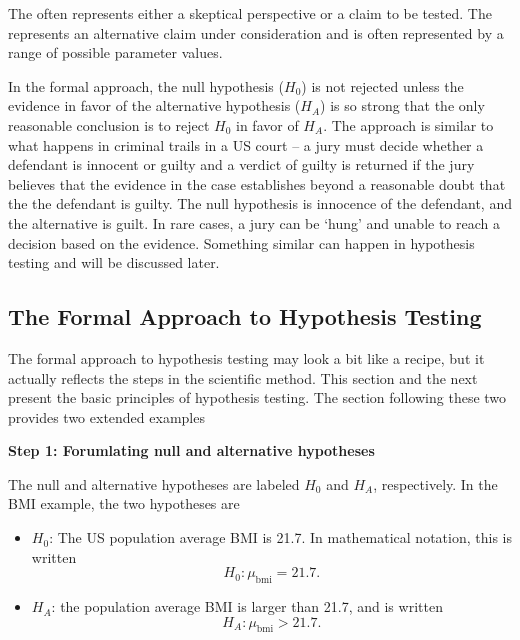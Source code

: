 \begin{spacing}{1.5}
\begin{termBox}{
{\small The  often represents either a skeptical perspective or a claim to be tested. The  represents an alternative claim under consideration and is often represented by a range of possible parameter values.}}
\end{termBox}

In the formal approach,  the null hypothesis ($H_0$) is not rejected  unless the evidence in favor of the alternative hypothesis ($H_A$) is so strong that the only reasonable conclusion is to reject $H_0$ in favor of $H_A$.  The approach is similar to what happens in criminal trails in a US court -- a jury must decide whether a defendant is innocent or guilty and a verdict of guilty is returned if the jury believes that the evidence in the case establishes beyond a reasonable doubt that the the defendant is guilty. The null hypothesis is innocence of the defendant, and the alternative is guilt.  In rare cases, a jury can be `hung' and unable to reach a decision based on the evidence.  Something similar can happen in  hypothesis testing and will be discussed later.

\subsection{The Formal Approach to Hypothesis Testing}
\label{formalHypothesisTesting}

The formal approach to hypothesis testing may look a bit like a recipe, but it actually reflects the steps in the scientific method.  This section and the next present the basic principles of hypothesis testing.  The section following these two provides two extended examples

\textbf{Step 1: Forumlating null and alternative hypotheses}

The null and alternative hypotheses are labeled $H_0$ and $H_A$, respectively.  In the BMI example, the two hypotheses are

\begin{itemize}
	\item $H_0$: The US population average BMI is 21.7.  In mathematical notation, this is written
	\begin{equation*}
		H_0: \mu_{\text{bmi}} = 21.7.
	\end{equation*}
	
	\item $H_A$: the population average BMI is larger than 21.7, and is written
	\begin{equation*}
		H_A: \mu_{\text{bmi}} > 21.7.
	\end{equation*}
	

\end{itemize}
\end{spacing}
